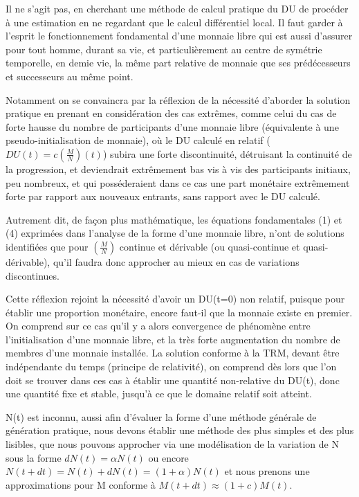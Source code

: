 \documentclass[a4paper,oneside,12pt]{article}
\begin{document}
Il ne s'agit pas, en cherchant une méthode de calcul pratique du DU de procéder à une estimation en ne regardant que le calcul différentiel local. Il faut garder à l'esprit le fonctionnement fondamental d'une monnaie libre qui est aussi d'assurer pour tout homme, durant sa vie, et particulièrement au centre de symétrie temporelle, en demie vie, la même part relative de monnaie que ses prédécesseurs et successeurs au même point.

Notamment on se convaincra par la réflexion de la nécessité d'aborder la solution pratique en prenant en considération des cas extrêmes, comme celui du cas de forte hausse du nombre de participants d'une monnaie libre (équivalente à une pseudo-initialisation de monnaie), où le DU calculé en relatif ($DU(t)=c\left(\frac{M}{N}\right)(t)$) subira une forte discontinuité, détruisant la continuité de la progression, et deviendrait extrêmement bas vis à vis des participants initiaux, peu nombreux, et qui posséderaient dans ce cas une part monétaire extrêmement forte par rapport aux nouveaux entrants, sans rapport avec le DU calculé.

Autrement dit, de façon plus mathématique, les équations fondamentales (1) et (4) exprimées dans l'analyse de la forme d'une monnaie libre, n'ont de solutions identifiées que pour $\left(\frac{M}{N}\right)$ continue et dérivable (ou quasi-continue et quasi-dérivable), qu'il faudra donc approcher au mieux en cas de variations discontinues.

Cette réflexion rejoint la nécessité d'avoir un DU(t=0) non relatif, puisque pour établir une proportion monétaire, encore faut-il que la monnaie existe en premier. On comprend sur ce cas qu'il y a alors convergence de phénomène entre l'initialisation d'une monnaie libre, et la très forte augmentation du nombre de membres d'une monnaie installée. La solution conforme à la TRM, devant être indépendante du temps (principe de relativité), on comprend dès lors que l'on doit se trouver dans ces cas à établir une quantité non-relative du DU(t), donc une quantité fixe et stable, jusqu'à ce que le domaine relatif soit atteint.

N(t) est inconnu, aussi afin d'évaluer la forme d'une méthode générale de génération pratique, nous devons établir une méthode des plus simples et des plus lisibles, que nous pouvons approcher via une modélisation de la variation de N sous la forme $dN(t)=\alpha N(t)$ ou encore $N(t+dt)=N(t)+dN(t)=(1+\alpha)N(t)$ et nous prenons une approximations pour M conforme à $M(t+dt) \approx (1+c) M(t)$.\par
\end{document}
